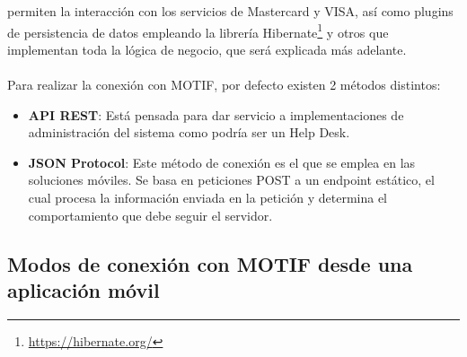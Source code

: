 \documentclass[a4paper, 12pt]{article}
\begin{document}
permiten la interacción con los servicios de Mastercard y VISA, así como plugins de persistencia de datos empleando
la librería Hibernate\footnote{\url{https://hibernate.org/}} y otros que implementan toda la lógica de negocio, que será explicada más adelante.
\\
\\
Para realizar la conexión con MOTIF, por defecto existen 2 métodos distintos:
\begin{itemize}
\item \textbf{API REST}: Está pensada para dar servicio a implementaciones de administración del sistema como podría ser un Help Desk.
\item \textbf{JSON Protocol}: Este método de conexión es el que se emplea en las soluciones móviles. Se basa en peticiones POST a un endpoint estático, el cual procesa la información enviada en la petición y determina el comportamiento que debe seguir el servidor.
\end{itemize}

\subsection{Modos de conexión con MOTIF desde una aplicación móvil}
\label{sec-2-3}
\end{document}
